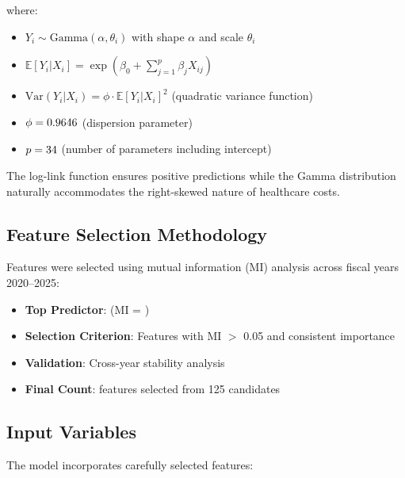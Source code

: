 where:
\begin{itemize}
    \item $Y_i \sim \text{Gamma}(\alpha, \theta_i)$ with shape $\alpha$ and scale $\theta_i$
    \item $\mathbb{E}[Y_i | X_i] = \exp\left(\beta_0 + \sum_{j=1}^{p} \beta_j X_{ij}\right)$
    \item $\text{Var}(Y_i | X_i) = \phi \cdot \mathbb{E}[Y_i | X_i]^2$ (quadratic variance function)
    \item $\phi = 0.9646{}$ (dispersion parameter)
    \item $p = 34{}$ (number of parameters including intercept)
\end{itemize}

The log-link function ensures positive predictions while the Gamma distribution naturally accommodates the right-skewed nature of healthcare costs.

\subsection{Feature Selection Methodology}

Features were selected using mutual information (MI) analysis across fiscal years 2020--2025:

\begin{itemize}
    \item \textbf{Top Predictor}: \ModelTwoTopFeature{} (MI = \ModelTwoTopFeatureMI{})
    \item \textbf{Selection Criterion}: Features with MI $>$ 0.05 and consistent importance
    \item \textbf{Validation}: Cross-year stability analysis
    \item \textbf{Final Count}: \ModelTwoNumFeatures{} features selected from 125 candidates
\end{itemize}

\subsection{Input Variables}

The model incorporates \ModelTwoNumFeatures{} carefully selected features:

